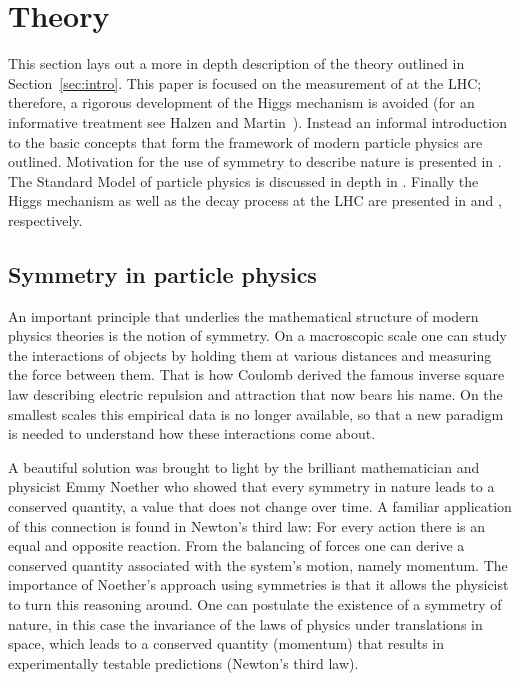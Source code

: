 \section{Theory}
\label{sec:theory}
This section lays out a more in depth description of the theory outlined in
Section~\ref{sec:intro}. This paper is focused on the
measurement of \HToZg at the LHC; therefore, a rigorous development of
the Higgs mechanism is avoided 
(for an informative treatment see Halzen and Martin~\cite{QuarksLeptons}).
Instead an informal introduction to the basic concepts that form
the framework of modern particle physics are outlined. 
Motivation for the use of symmetry to describe nature is presented in 
. The Standard Model of particle physics is discussed
in depth in . Finally the Higgs mechanism as well
as the \HToZg decay process at the LHC are presented in  and 
, respectively.

\subsection{Symmetry in particle physics}
\label{subsec:symmetry}

An important principle that underlies the mathematical structure of modern physics
theories is the notion of symmetry. On a macroscopic scale one can study
the interactions of objects by holding them at various
distances and measuring the force between them. That is how Coulomb derived
the famous inverse square law describing electric repulsion and attraction that
now bears his name. On the smallest scales this empirical data is no longer
available, so that a new paradigm is needed to understand how these interactions
come about. 

A beautiful solution was brought to light by the brilliant 
mathematician and physicist Emmy Noether who showed that every symmetry in
nature leads to a conserved quantity, a value that does not change over time.
A familiar application of this connection is found in Newton's third law:
For every action there is an equal and opposite reaction. From the balancing of
forces one can derive a conserved quantity associated with the system's 
motion, namely momentum. The importance of Noether's approach using symmetries
is that it allows the physicist to turn this reasoning around. One can postulate
the existence of a symmetry of nature, in this case the invariance of the laws
of physics under translations in space, which leads to a conserved quantity (momentum)
that results in experimentally testable predictions (Newton's third law).

